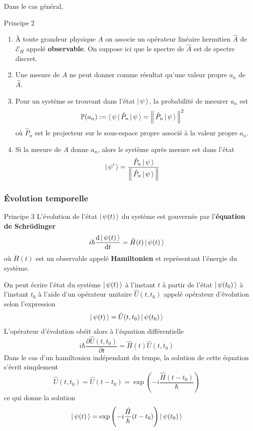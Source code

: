 Dans le cas général,

\begin{omed}{Principe 2}
    \begin{enumerate}[label=($p_{\arabic*}$)]
        \item À toute grandeur physique $A$ on associe un opérateur linéaire hermitien $\hat{A}$ de $\mathcal{E}_H$ appelé \textbf{observable}. On suppose ici que le spectre de $\hat{A}$ est de spectre discret.
        \item Une mesure de $A$ ne peut donner comme résultat qu’une valeur propre $a_n$ de $\hat{A}$.
        \item Pour un système se trouvant dans l’état $\left| \, \psi \, \right>$, la probabilité de mesurer $a_n$ est
              \[ \mathbb{P}(a_n) := \left< \, \psi \, \right| \hat{P}_n \left| \, \psi \, \right> = \left\lVert \, \hat{P}_n \left| \, \psi \, \right> \, \right\rVert^2 \]
              où $\hat{P}_n$ est le projecteur sur le sous-espace propre associé à la valeur propre $a_n$.
        \item Si la mesure de $A$ donne $a_n$, alors le système après mesure est dans l’état
              \[ \left| \, \psi' \, \right> = \frac{\hat{P}_n \left| \, \psi \, \right>}{\left\lVert \, \hat{P}_n \left| \, \psi \, \right> \, \right\rVert} \]
    \end{enumerate}
\end{omed}

    \subsubsection{Évolution temporelle}

\begin{omed}{Principe 3}
    L’évolution de l’état $\left| \, \psi(t) \, \right>$ du système est gouvernée par l’\textbf{équation de Schrödinger}
    \[ i\hbar \frac{\text{d}\left| \, \psi(t) \, \right>}{\text{d}t} = \hat{H}(t) \left| \, \psi(t) \, \right> \]
    où $\bar{H}(t)$ est un observable appelé \textbf{Hamiltonien} et représentant l’énergie du système.
\end{omed}

On peut écrire l’état du système $\left| \, \psi(t) \, \right>$ à l’instant $t$ à partir de l’état $\left| \, \psi(t_0) \, \right>$ à l’instant $t_0$ à l’aide d’un opérateur unitaire $\hat{U}(t,t_0)$ appelé opérateur d’évolution selon l’expression 
\[ \left| \, \psi(t) \, \right> = \hat{U}(t,t_0) \left| \, \psi(t_0) \, \right> \]   
L’opérateur d’évolution obéit alors à l’équation différentielle 
\[ i\hbar \frac{\partial \hat{U}(t,t_0)}{\partial t} = \hat{H}(t) \hat{U}(t,t_0) \]   
Dans le cas d’un hamiltonien indépendant du temps, la solution de cette équation s’écrit simplement 
\[ \hat{U}(t,t_0) = \hat{U}(t-t_0) = \exp\left(-i\frac{\hat{H}(t-t_0)}{\hbar}\right) \]  
ce qui donne la solution
\[ \left| \, \psi(t) \, \right> = \exp\left(-i\frac{\hat{H}}{\hbar}(t - t_0)\right) \left| \, \psi(t_0) \, \right> \]